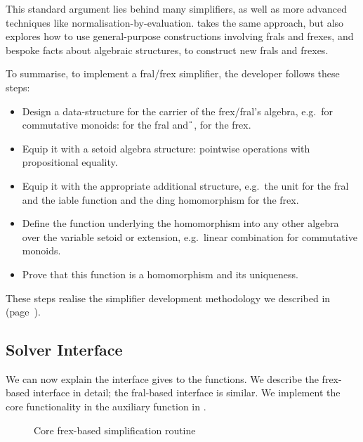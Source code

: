 This standard argument lies behind many simplifiers, as well as more
advanced techniques like normalisation-by-evaluation. \Frexlib{} takes the same approach, but also explores how to use
general-purpose constructions involving frals and frexes, and bespoke
facts about algebraic structures, to construct new frals and frexes.

To summarise, to implement a fral/frex simplifier, the developer
follows these steps:
\begin{itemize}
\item Design a data-structure for the carrier of the frex/fral's
  algebra, e.g.~for commutative monoids:
   \nvar{}  for the fral
  and \IdrisKeyword{(}\U{} \avar{},  \nvar{}
  \IdrisKeyword{)} for the frex.
\item Equip it with a setoid algebra structure: pointwise
  operations with propositional equality.
\item Equip it with the appropriate additional structure, e.g.~the
  unit for the fral and the iable function and the
  ding homomorphism for the frex.
\item Define the function underlying the homomorphism into any other
  algebra over the variable setoid or extension, e.g.~linear
  combination for commutative monoids.
\item Prove that this function is a homomorphism and its uniqueness.
\end{itemize}
These steps realise the simplifier development methodology
we described in  (page~\pageref{methodology-anchor}).

\subsection{Solver Interface}
We can now explain the interface \Frexlib{} gives to the 
functions. We describe the frex-based interface in detail; the
fral-based interface is similar. We implement the core functionality in the
auxiliary function  in .
\begin{figure}
  \begin{minipage}{.75\textwidth}
    \solveVectType[numbers=left]{}
  \end{minipage}
  \caption{Core frex-based simplification routine}
\end{figure}

